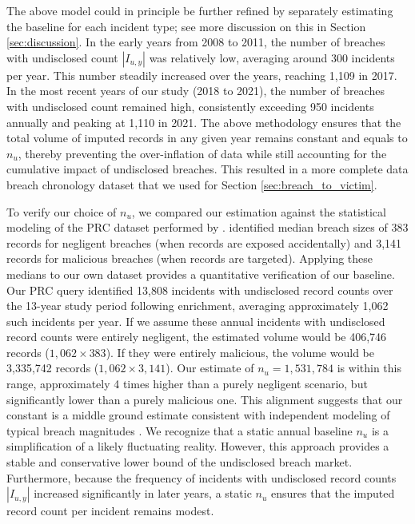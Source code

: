 The above model could in principle be further refined by separately estimating the baseline for each incident type; see more discussion on this in Section \ref{sec:discussion}.
  In the early years from 2008 to 2011, the number of breaches with undisclosed count $|I_{u,y}|$ was relatively low, averaging around 300 incidents per year. This number steadily increased over the years, reaching 1,109 in 2017. In the most recent years of our study (2018 to 2021), the number of breaches with undisclosed count remained high, consistently exceeding 950 incidents annually and peaking at 1,110 in 2021. The above methodology ensures that the total volume of imputed records in any given year remains constant and equals to $n_u$, thereby preventing the over-inflation of data while still accounting for the cumulative impact of undisclosed breaches. This resulted in a more complete data breach chronology dataset that we used for Section \ref{sec:breach_to_victim}. 

To verify our choice of $n_u$, we compared our estimation against the statistical modeling of the PRC dataset performed by \cite{Edwards2016Hype}. \citet{Edwards2016Hype} identified median breach sizes of 383 records for negligent breaches (when records are exposed accidentally) and 3,141 records for malicious breaches (when records are targeted). Applying these medians to our own dataset provides a quantitative verification of our baseline. Our PRC query identified 13,808 incidents with undisclosed record counts over the 13-year study period following enrichment, averaging approximately 1,062 such incidents per year. If we assume these annual incidents with undisclosed record counts were entirely negligent, the estimated volume would be 406,746 records ($1,062 \times 383$). If they were entirely malicious, the volume would be 3,335,742 records ($1,062 \times 3,141$). Our estimate of $n_u = 1,531,784$ is within this range, approximately 4 times higher than a purely negligent scenario, but significantly lower than a purely malicious one. This alignment suggests that our constant is a middle ground estimate consistent with independent modeling of typical breach magnitudes \cite{Edwards2016Hype}. We recognize that a static annual baseline $n_u$ is a simplification of a likely fluctuating reality. However, this approach provides a stable and conservative lower bound of the undisclosed breach market. Furthermore, because the frequency of incidents with undisclosed record counts $|I_{u,y}|$ increased significantly in later years, a static $n_u$ ensures that the imputed record count per incident remains modest.
